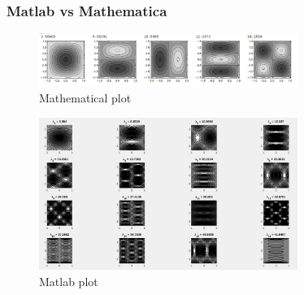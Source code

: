 \documentclass{beamer}
\begin{document}
\begin{frame}
  \frametitle{Matlab vs Mathematica}
  \begin{figure}[h!]
    \centering
    \includegraphics[width = 0.75\textwidth]{mathematica1.png}
    \caption{Mathematical plot}
  \end{figure}
  
  \begin{figure}[h!]
    \centering
    \includegraphics[width = 0.75\textwidth]{sede1.png}
    \caption{Matlab plot}
  \end{figure}
\end{frame}
\end{document}
